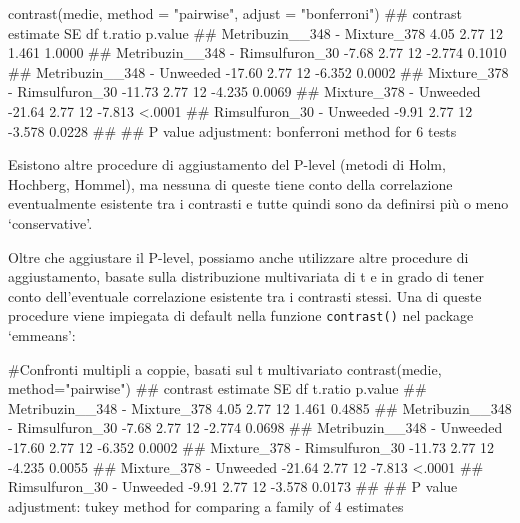 \documentclass[a4paper,12pt,oneside]{book}
\newenvironment{Shaded}{\begin{snugshade}}{\end{snugshade}}
\newcommand{\StringTok}[1]{#1}
\newcommand{\CommentTok}[1]{#1}
\newcommand{\DocumentationTok}[1]{#1}
\newcommand{\FunctionTok}[1]{#1}
\newcommand{\AttributeTok}[1]{#1}
\newcommand{\NormalTok}[1]{#1}
\begin{document}
\begin{Shaded}
\begin{Highlighting}[]
\FunctionTok{contrast}\NormalTok{(medie, }\AttributeTok{method =} \StringTok{"pairwise"}\NormalTok{, }\AttributeTok{adjust =} \StringTok{"bonferroni"}\NormalTok{)}
\DocumentationTok{\#\#  contrast                         estimate   SE df t.ratio p.value}
\DocumentationTok{\#\#  Metribuzin\_\_348 {-} Mixture\_378        4.05 2.77 12   1.461  1.0000}
\DocumentationTok{\#\#  Metribuzin\_\_348 {-} Rimsulfuron\_30    {-}7.68 2.77 12  {-}2.774  0.1010}
\DocumentationTok{\#\#  Metribuzin\_\_348 {-} Unweeded         {-}17.60 2.77 12  {-}6.352  0.0002}
\DocumentationTok{\#\#  Mixture\_378 {-} Rimsulfuron\_30       {-}11.73 2.77 12  {-}4.235  0.0069}
\DocumentationTok{\#\#  Mixture\_378 {-} Unweeded             {-}21.64 2.77 12  {-}7.813  \textless{}.0001}
\DocumentationTok{\#\#  Rimsulfuron\_30 {-} Unweeded           {-}9.91 2.77 12  {-}3.578  0.0228}
\DocumentationTok{\#\# }
\DocumentationTok{\#\# P value adjustment: bonferroni method for 6 tests}
\end{Highlighting}
\end{Shaded}

Esistono altre procedure di aggiustamento del P-level (metodi di Holm, Hochberg, Hommel), ma nessuna di queste tiene conto della correlazione eventualmente esistente tra i contrasti e tutte quindi sono da definirsi più o meno `conservative'.

Oltre che aggiustare il P-level, possiamo anche utilizzare altre procedure di aggiustamento, basate sulla distribuzione multivariata di t e in grado di tener conto dell'eventuale correlazione esistente tra i contrasti stessi. Una di queste procedure viene impiegata di default nella funzione \texttt{contrast()} nel package `emmeans':

\small

\begin{Shaded}
\begin{Highlighting}[]
\CommentTok{\#Confronti multipli a coppie, basati sul t multivariato}
\FunctionTok{contrast}\NormalTok{(medie, }\AttributeTok{method=}\StringTok{"pairwise"}\NormalTok{)}
\DocumentationTok{\#\#  contrast                         estimate   SE df t.ratio p.value}
\DocumentationTok{\#\#  Metribuzin\_\_348 {-} Mixture\_378        4.05 2.77 12   1.461  0.4885}
\DocumentationTok{\#\#  Metribuzin\_\_348 {-} Rimsulfuron\_30    {-}7.68 2.77 12  {-}2.774  0.0698}
\DocumentationTok{\#\#  Metribuzin\_\_348 {-} Unweeded         {-}17.60 2.77 12  {-}6.352  0.0002}
\DocumentationTok{\#\#  Mixture\_378 {-} Rimsulfuron\_30       {-}11.73 2.77 12  {-}4.235  0.0055}
\DocumentationTok{\#\#  Mixture\_378 {-} Unweeded             {-}21.64 2.77 12  {-}7.813  \textless{}.0001}
\DocumentationTok{\#\#  Rimsulfuron\_30 {-} Unweeded           {-}9.91 2.77 12  {-}3.578  0.0173}
\DocumentationTok{\#\# }
\DocumentationTok{\#\# P value adjustment: tukey method for comparing a family of 4 estimates}
\end{Highlighting}
\end{Shaded}
\end{document}

